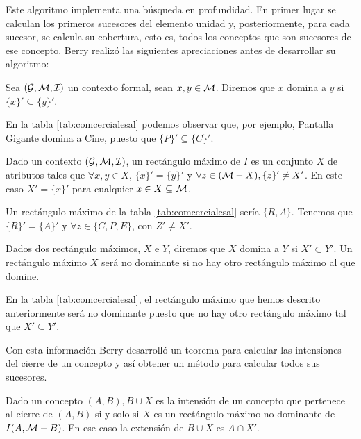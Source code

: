 \documentclass[oneside,openright,titlepage,numbers=noenddot,openany,headinclude,footinclude=true,
cleardoublepage=empty,abstractoff,BCOR=5mm,paper=a4,fontsize=12pt,main=spanish]{scrreprt}
\begin{document}
Este algoritmo implementa una búsqueda en profundidad. En primer lugar se calculan los primeros sucesores del elemento unidad y, posteriormente, para cada sucesor, se calcula su cobertura, esto es, todos los conceptos que son sucesores de ese concepto. Berry \cite{berry} realizó las siguientes apreciaciones antes de desarrollar su algoritmo:

\begin{definition}
Sea $(\mathcal{G},\mathcal{M},\mathcal{I})$ un contexto formal, sean $x, y \in \mathcal{M}$. Diremos que $x$ domina a $y$ si $\{x\}' \subseteq \{y\}'$. 
\end{definition}

En la tabla \ref{tab:comcercialesal} podemos observar que, por ejemplo, Pantalla Gigante domina a Cine, puesto que $\{P\}'\subseteq \{C\}'$.

\begin{definition}
Dado un contexto $(\mathcal{G},\mathcal{M},\mathcal{I})$, un rectángulo máximo de $I$ es un conjunto $X$ de atributos tales que $\forall x,y \in X$, $\{x\}'=\{y\}'$ y $\forall z \in (\mathcal{M}-X), \{z\}' \neq X'$. En este caso $X'=\{x\}'$ para cualquier $x \in X \subseteq \mathcal{M}$.
\end{definition}

Un rectángulo máximo de la tabla \ref{tab:comcercialesal} sería $\{R,A\}$. Tenemos que $\{R\}'=\{A\}'$ y $\forall z \in \{C,P,E\}$, con $Z'\neq X'$.

\begin{definition}
Dados dos rectángulo máximos, $X$ e $Y$, diremos que $X$ domina a $Y$ si $X'\subset Y'$. Un rectángulo máximo $X$ será no dominante si no hay otro rectángulo máximo al que domine.
\end{definition}

En la tabla \ref{tab:comcercialesal},  el rectángulo máximo  que hemos descrito anteriormente será no dominante puesto que no hay otro rectángulo máximo tal que $X' \subseteq Y'$.

Con esta información Berry desarrolló un teorema para calcular las intensiones del cierre de un concepto y así obtener un método para calcular todos sus sucesores.

\begin{theorem}\cite{berry:THEOREM}
Dado un concepto $(A,B), B\cup X$ es la intensión de un concepto que pertenece al cierre de $(A,B)$ si y solo si $X$ es un rectángulo máximo no dominante de $I(A,\mathcal{M}-B)$. En ese caso la extensión de $B\cup X$ es $A \cap  X'$.
\end{theorem}
\end{document}
